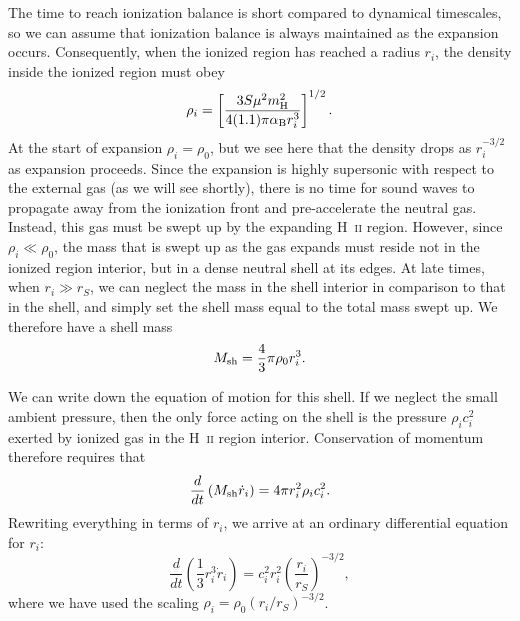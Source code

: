 The time to reach ionization balance is short compared to dynamical timescales, so we can assume that ionization balance is always maintained as the expansion occurs. Consequently, when the ionized region has reached a radius $r_i$, the density inside the ionized region must obey
\begin{equation}
\rho_i = \left[\frac{3 S \mu^2 m_{\rm H}^2}{4(1.1)\pi \alpha_{\mathrm{B}} r_i^3}\right]^{1/2}.
\end{equation}
At the start of expansion $\rho_i = \rho_0$, but we see here that the density drops as $r_i^{-3/2}$ as expansion proceeds. Since the expansion is highly supersonic with respect to the external gas (as we will see shortly), there is no time for sound waves to propagate away from the ionization front and pre-accelerate the neutral gas. Instead, this gas must be swept up by the expanding H~\textsc{ii} region. However, since $\rho_i \ll \rho_0$, the mass that is swept up as the gas expands must reside not in the ionized region interior, but in a dense neutral shell at its edges. At late times, when $r_i \gg r_S$, we can neglect the mass in the shell interior in comparison to that in the shell, and simply set the shell mass equal to the total mass swept up. We therefore have a shell mass
\begin{equation}
M_{\rm sh} = \frac{4}{3} \pi \rho_0 r_i^3.
\end{equation}

We can write down the equation of motion for this shell. If we neglect the small ambient pressure, then the only force acting on the shell is the pressure $\rho_i c_i^2$ exerted by ionized gas in the H~\textsc{ii} region interior. Conservation of momentum therefore requires that
\begin{equation}
\frac{d}{dt} \left(M_{\rm sh} \dot{r}_i\right) = 4\pi r_i^2 \rho_i c_i^2.
\end{equation}
Rewriting everything in terms of $r_i$, we arrive at an ordinary differential equation for $r_i$:
\begin{equation}
\frac{d}{dt} \left(\frac{1}{3} r_i^3 \dot{r}_i\right) = c_i^2 r_i^2 \left(\frac{r_i}{r_S}\right)^{-3/2},
\end{equation}
where we have used the scaling $\rho_i = \rho_0 (r_i/r_S)^{-3/2}$.

